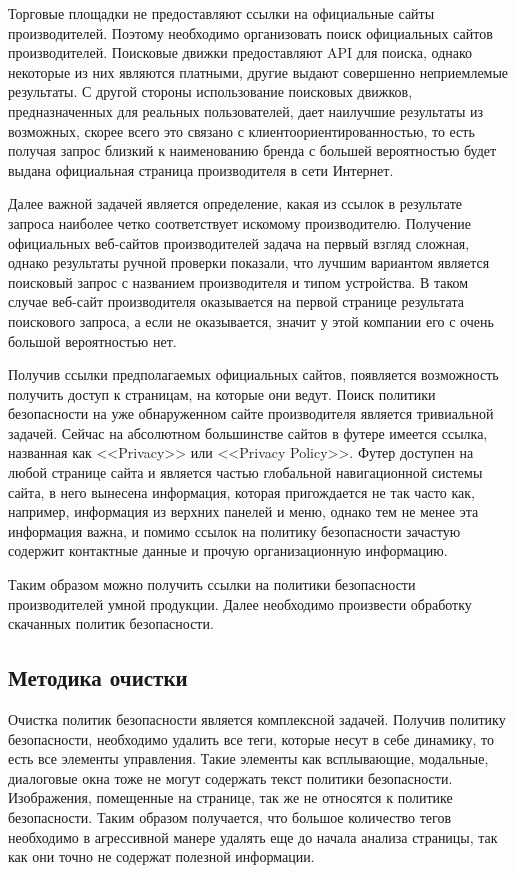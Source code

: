 \documentclass[../main]{subfiles}
\begin{document}
Торговые площадки не предоставляют ссылки на официальные сайты производителей. Поэтому необходимо организовать поиск официальных сайтов производителей. Поисковые движки предоставляют API для поиска, однако некоторые из них являются платными, другие выдают совершенно неприемлемые результаты. С другой стороны использование поисковых движков, предназначенных для реальных пользователей, дает наилучшие результаты из возможных, скорее всего это связано с клиентоориентированностью, то есть получая запрос близкий к наименованию бренда с большей вероятностью будет выдана официальная страница производителя в сети Интернет.

Далее важной задачей является определение, какая из ссылок в результате запроса наиболее четко соответствует искомому производителю. Получение официальных веб-сайтов производителей задача на первый взгляд сложная, однако результаты ручной проверки показали, что лучшим вариантом является поисковый запрос с названием производителя и типом устройства. В таком случае веб-сайт производителя оказывается на первой странице результата поискового запроса, а если не оказывается, значит у этой компании его с очень большой вероятностью нет. 

Получив ссылки предполагаемых официальных сайтов, появляется возможность получить доступ к страницам, на которые они ведут. Поиск политики безопасности на уже обнаруженном сайте производителя является тривиальной задачей. Сейчас на абсолютном большинстве сайтов в футере имеется ссылка, названная как <<Privacy>> или <<Privacy Policy>>. Футер доступен на любой странице сайта и является частью глобальной навигационной системы сайта, в него вынесена информация, которая пригождается не так часто как, например, информация из верхних панелей и меню, однако тем не менее эта информация важна, и помимо ссылок на политику безопасности зачастую содержит контактные данные и прочую организационную информацию.

Таким образом можно получить ссылки на политики безопасности производителей умной продукции. Далее необходимо произвести обработку скачанных политик безопасности.

\subsection{Методика очистки}

Очистка политик безопасности является комплексной задачей. Получив политику безопасности, необходимо удалить все теги, которые несут в себе динамику, то есть все элементы управления. Такие элементы как всплывающие, модальные, диалоговые окна тоже не могут содержать текст политики безопасности. Изображения, помещенные на странице, так же не относятся к политике безопасности. Таким образом получается, что большое количество тегов необходимо в агрессивной манере удалять еще до начала анализа страницы, так как они точно не содержат полезной информации.
\end{document}
